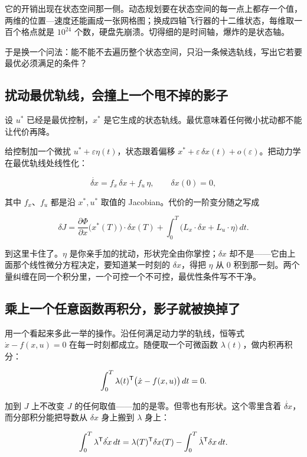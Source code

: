 它的开销出现在状态空间那一侧。动态规划要在状态空间的每一点上都存一个值，两维的位置---速度还能画成一张网格图；换成四轴飞行器的十二维状态，每维取一百个格点就是 \(10^{24}\) 个数，硬盘先崩溃。切得细的是时间轴，爆炸的是状态轴。

于是换一个问法：能不能不去遍历整个状态空间，只沿一条候选轨线，写出它若要最优必须满足的条件？

\subsection{扰动最优轨线，会撞上一个甩不掉的影子}

设 \(u^*\) 已经是最优控制，\(x^*\) 是它生成的状态轨线。最优意味着任何微小扰动都不能让代价再降。

给控制加一个微扰 \(u^* + \varepsilon\eta(t)\)，状态跟着偏移 \(x^* + \varepsilon\,\delta x(t) + o(\varepsilon)\)。把动力学在最优轨线处线性化：

\[
\dot{\delta x} = f_x\, \delta x + f_u\, \eta, \qquad \delta x(0) = 0,
\]

其中 \(f_x\)、\(f_u\) 都是沿 \(x^*, u^*\) 取值的 Jacobian。代价的一阶变分随之写成

\[
\delta J = \frac{\partial\Phi}{\partial x}\big(x^*(T)\big)\cdot \delta x(T)
+ \int_0^T \big( L_x\cdot \delta x + L_u\cdot \eta \big)\, dt.
\]

到这里卡住了。\(\eta\) 是你亲手加的扰动，形状完全由你掌控；\(\delta x\) 却不是——它由上面那个线性微分方程决定，要知道某一时刻的 \(\delta x\)，得把 \(\eta\) 从 0 积到那一刻。两个量纠缠在同一个积分里，一个可控一个不可控，最优性条件写不干净。

\subsection{乘上一个任意函数再积分，影子就被换掉了}

用一个看起来多此一举的操作。沿任何满足动力学的轨线，恒等式 \(\dot x - f(x,u) = 0\) 在每一时刻都成立。随便取一个可微函数 \(\lambda(t)\)，做内积再积分：

\[
\int_0^T \lambda(t)^{\mathsf{T}}\big(\dot x - f(x,u)\big)\, dt = 0.
\]

加到 \(J\) 上不改变 \(J\) 的任何取值——加的是零。但零也有形状。这个零里含着 \(\dot{\delta x}\)，而分部积分能把导数从 \(\delta x\) 身上搬到 \(\lambda\) 身上：

\[
\int_0^T \lambda^{\mathsf{T}}\dot{\delta x}\, dt
= \lambda(T)^{\mathsf{T}}\delta x(T) - \int_0^T \dot\lambda^{\mathsf{T}}\delta x\, dt .
\]

